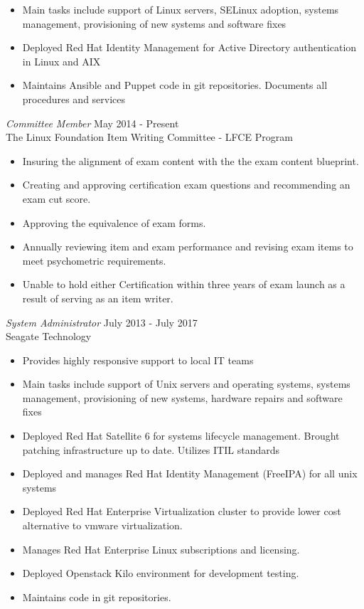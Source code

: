\documentclass[margin]{res}
\begin{document}
\begin{resume}
\begin{itemize}
		\item Main tasks include support of Linux servers, SELinux adoption, systems management, provisioning of new systems and software fixes
		\item Deployed Red Hat Identity Management for Active Directory authentication in Linux and AIX
		\item Maintains Ansible and Puppet code in git repositories. Documents all procedures and services
	\end{itemize}
	{\sl Committee Member} \hfill May 2014 - Present \\
    The Linux Foundation Item Writing Committee - LFCE Program
    \begin{itemize}  \itemsep -2pt %
	    \item Insuring the alignment of exam content with the the exam content blueprint.
	    \item Creating and approving certification exam questions and recommending an exam cut score.
	    \item Approving the equivalence of exam forms.
	    \item Annually reviewing item and exam performance and revising exam items to meet psychometric requirements.
	    \item Unable to hold either Certification within three years of exam launch as a result of serving as an item writer.
    \end{itemize}
	{\sl System Administrator} \hfill July 2013 - July 2017 \\
	Seagate Technology
	\begin{itemize}  \itemsep -2pt %
		\item Provides highly responsive support to local IT teams
		\item Main tasks include support of Unix servers and operating systems, systems management, provisioning of new systems, hardware repairs and software fixes
		\item Deployed Red Hat Satellite 6 for systems lifecycle management. Brought patching infrastructure up to date. Utilizes ITIL standards
		\item Deployed and manages Red Hat Identity Management (FreeIPA) for all unix systems
		\item Deployed Red Hat Enterprise Virtualization cluster to provide lower cost alternative to vmware virtualization.
		\item Manages Red Hat Enterprise Linux subscriptions and licensing.
		\item Deployed Openstack Kilo environment for development testing.
		\item Maintains code in git repositories.
	\end{itemize}
\end{resume}
\end{document}

